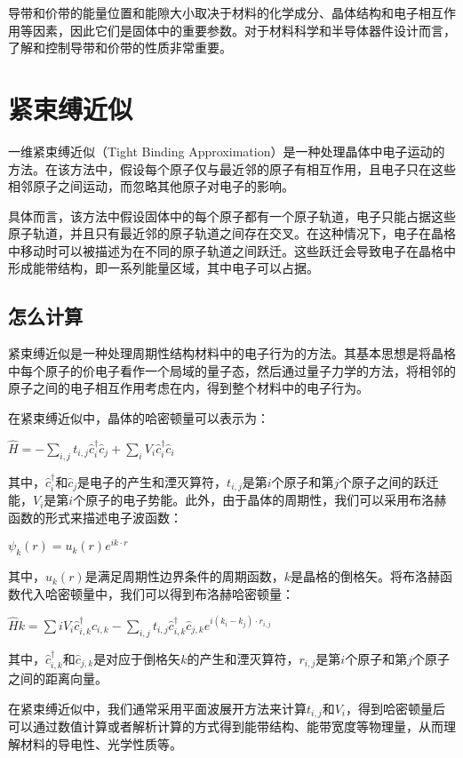 \documentclass[12pt, a4paper, oneside]{ctexart}
\begin{document}
\begin{spacing}{2.0}
导带和价带的能量位置和能隙大小取决于材料的化学成分、晶体结构和电子相互作用等因素，因此它们是固体中的重要参数。对于材料科学和半导体器件设计而言，了解和控制导带和价带的性质非常重要。
\section{紧束缚近似}
一维紧束缚近似（Tight Binding Approximation）是一种处理晶体中电子运动的方法。在该方法中，假设每个原子仅与最近邻的原子有相互作用，且电子只在这些相邻原子之间运动，而忽略其他原子对电子的影响。

具体而言，该方法中假设固体中的每个原子都有一个原子轨道，电子只能占据这些原子轨道，并且只有最近邻的原子轨道之间存在交叉。在这种情况下，电子在晶格中移动时可以被描述为在不同的原子轨道之间跃迁。这些跃迁会导致电子在晶格中形成能带结构，即一系列能量区域，其中电子可以占据。
\subsection{怎么计算}
紧束缚近似是一种处理周期性结构材料中的电子行为的方法。其基本思想是将晶格中每个原子的价电子看作一个局域的量子态，然后通过量子力学的方法，将相邻的原子之间的电子相互作用考虑在内，得到整个材料中的电子行为。

在紧束缚近似中，晶体的哈密顿量可以表示为：

$\hat{H}=-\sum_{i,j}t_{i,j}\hat{c}_{i}^{\dagger}\hat{c}_{j}+\sum_{i}V_{i}\hat{c}_{i}^{\dagger}\hat{c}_{i}$

其中，$\hat{c}_{i}^{\dagger}$和$\hat{c}_{j}$是电子的产生和湮灭算符，$t_{i,j}$是第$i$个原子和第$j$个原子之间的跃迁能，$V_{i}$是第$i$个原子的电子势能。此外，由于晶体的周期性，我们可以采用布洛赫函数的形式来描述电子波函数：

$\psi_{k}(r)=u_{k}(r)e^{ik\cdot r}$

其中，$u_{k}(r)$是满足周期性边界条件的周期函数，$k$是晶格的倒格矢。将布洛赫函数代入哈密顿量中，我们可以得到布洛赫哈密顿量：

$\hat{H}{k}=\sum{i}V_{i}\hat{c}_{i,k}^{\dagger}\hat{c}_{i,k}-\sum_{i,j}t_{i,j}\hat{c}_{i,k}^{\dagger}\hat{c}_{j,k}e^{i(k_{i}-k_{j})\cdot r_{i,j}}$

其中，$\hat{c}_{i,k}^{\dagger}$和$\hat{c}_{j,k}$是对应于倒格矢$k$的产生和湮灭算符，$r_{i,j}$是第$i$个原子和第$j$个原子之间的距离向量。

在紧束缚近似中，我们通常采用平面波展开方法来计算$t_{i,j}$和$V_{i}$，得到哈密顿量后可以通过数值计算或者解析计算的方式得到能带结构、能带宽度等物理量，从而理解材料的导电性、光学性质等。


\end{spacing}
\end{document}
